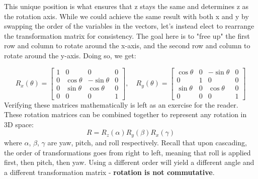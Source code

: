 \documentclass{article}
\begin{document}
This unique position is what ensures that z stays the same and determines z as the rotation axis. While we could achieve the same result with both x and y by swapping the order of the variables in the vectors, let's instead elect to rearrange the transformation matrix for consistency. The goal here is to "free up" the first row and column to rotate around the x-axis, and the second row and column to rotate around the y-axis. Doing so, we get:

\[
R_x(\theta) = 
\begin{bmatrix}
1 & 0 & 0 & 0 \\
0 & \cos \theta & -\sin \theta & 0 \\
0 & \sin \theta & \cos \theta & 0 \\
0 & 0 & 0 & 1
\end{bmatrix}
,\quad
R_y(\theta) = 
\begin{bmatrix}
\cos \theta & 0 & -\sin \theta & 0 \\
0 & 1 & 0 & 0 \\
\sin \theta & 0 & \cos \theta & 0 \\
0 & 0 & 0 & 1
\end{bmatrix}
\]
\noindent
Verifying these matrices mathematically is left as an exercise for the reader. These rotation matrices can be combined together to represent any rotation in 3D space:
\[R = R _ { z } ( \alpha ) R _ { y } ( \beta ) R _ { x } ( \gamma )\]
where $\alpha$, $\beta$, $\gamma$ are yaw, pitch, and roll respectively. Recall that upon cascading, the order of transformations goes from right to left, meaning that roll is applied first, then pitch, then yaw. Using a different order will yield a different angle and a different transformation matrix - \textbf{rotation is not commutative}.
\end{document}
